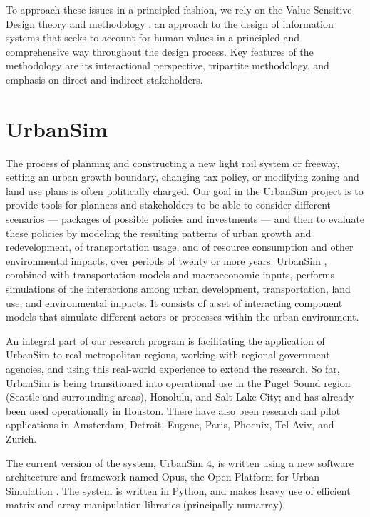 \documentclass{acm_proc_article-sp}
\begin{document}
To approach these issues in a principled
fashion, we rely on the Value Sensitive Design theory and methodology
\cite{friedman-amis-2006}, an approach to the design of information systems
that seeks to account for human values in a principled and comprehensive
way throughout the design process.  Key features of the methodology are its
interactional perspective, tripartite methodology, and emphasis on direct
and indirect stakeholders.

\section{UrbanSim}

The process of planning and constructing a new light rail system or
freeway, setting an urban growth boundary, changing tax policy, or
modifying zoning and land use plans is often politically charged.  Our goal
in the UrbanSim project is to provide tools for planners and stakeholders
to be able to consider different scenarios --- packages of possible
policies and investments --- and then to evaluate these policies by
modeling the resulting patterns of urban growth and redevelopment, of
transportation usage, and of resource consumption and other environmental
impacts, over periods of twenty or more years.  UrbanSim
\cite{waddell-nse-2003,waddell-ulfarsson-2004}, combined with
transportation models and macroeconomic inputs, performs simulations of the
interactions among urban development, transportation, land use, and
environmental impacts. It consists of a set of interacting component models
that simulate different actors or processes within the urban environment.

An integral part of our research program is facilitating the application of
UrbanSim to real metropolitan regions, working with regional government
agencies, and using this real-world experience to extend the research.  So
far, UrbanSim is being transitioned into operational use in the Puget Sound
region (Seattle and surrounding areas), Honolulu, and Salt Lake City; and
has already been used operationally in Houston.  There have also been
research and pilot applications in Amsterdam, Detroit, Eugene, Paris,
Phoenix, Tel Aviv, and Zurich.

The current version of the system, UrbanSim 4, is written using a new
software architecture and framework named Opus, the Open Platform for Urban
Simulation \cite{waddell-opus-2005}.  The system is written in Python, and
makes heavy use of efficient matrix and array manipulation libraries
(principally numarray).
\end{document}
